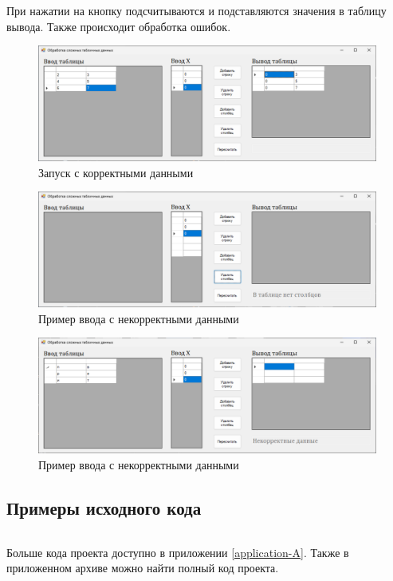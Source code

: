 При нажатии на кнопку подсчитываются и подставляются значения в таблицу вывода. Также происходит обработка ошибок.

\begin{figure}
\centering
\includegraphics[width=0.5\linewidth]{images//handling-data-hard/okay.png}
\caption{Запуск с корректными данными}
\label{fig:handling-data-hard-okay}
\end{figure}

\begin{figure}
\centering
\includegraphics[width=0.5\linewidth]{images//handling-data-hard/error.png}
\caption{Пример ввода с некорректными данными}
\label{fig:handling-data-hard-error}
\end{figure}

\begin{figure}
\centering
\includegraphics[width=0.5\linewidth]{images//handling-data-hard/error2.png}
\caption{Пример ввода с некорректными данными}
\label{fig:handling-data-hard-error2}
\end{figure}

\subsection{Примеры исходного кода}
\begin{verbatim}

\end{verbatim}

Больше кода проекта доступно в приложении \ref{application-A}. Также в приложенном архиве можно найти полный код проекта.